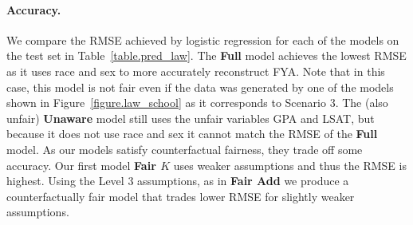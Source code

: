 
\paragraph{Accuracy.}
We compare the RMSE achieved by logistic regression for each of the models on the test set in Table~\ref{table.pred_law}.  The \textbf{Full} model achieves the lowest RMSE as it uses race and sex to more accurately reconstruct FYA. Note that in this case, this model is not fair even if the data was generated by one of the models shown in Figure~\ref{figure.law_school} as it corresponds to Scenario 3. The (also unfair) \textbf{Unaware} model still uses the unfair variables GPA and LSAT, but because it does not use race and sex it cannot match the RMSE of the \textbf{Full} model. As our models satisfy counterfactual fairness, they trade off some accuracy. Our first model \textbf{Fair $K$} uses weaker assumptions and thus the RMSE is highest. Using the Level 3 assumptions, as in \textbf{Fair Add} we produce a counterfactually fair model that trades lower RMSE for slightly weaker assumptions.

